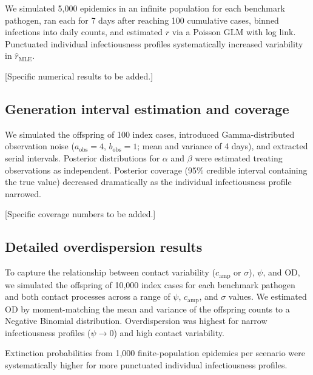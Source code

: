 \documentclass[10pt]{article}
\begin{document}
We simulated 5,000 epidemics in an infinite population for each benchmark pathogen, ran each for 7 days after reaching 100 cumulative cases, binned infections into daily counts, and estimated $r$ via a Poisson GLM with log link. Punctuated individual infectiousness profiles systematically increased variability in $\hat{r}_\text{MLE}$.

[Specific numerical results to be added.]

\subsection{Generation interval estimation and coverage}

We simulated the offspring of 100 index cases, introduced Gamma-distributed observation noise ($a_\text{obs} = 4$, $b_\text{obs} = 1$; mean and variance of 4 days), and extracted serial intervals. Posterior distributions for $\alpha$ and $\beta$ were estimated treating observations as independent. Posterior coverage (95\% credible interval containing the true value) decreased dramatically as the individual infectiousness profile narrowed.

[Specific coverage numbers to be added.]

\subsection{Detailed overdispersion results}

To capture the relationship between contact variability ($c_\text{amp}$ or $\sigma$), $\psi$, and OD, we simulated the offspring of 10,000 index cases for each benchmark pathogen and both contact processes across a range of $\psi$, $c_\text{amp}$, and $\sigma$ values. We estimated OD by moment-matching the mean and variance of the offspring counts to a Negative Binomial distribution. Overdispersion was highest for narrow infectiousness profiles ($\psi \to 0$) and high contact variability.

Extinction probabilities from 1,000 finite-population epidemics per scenario were systematically higher for more punctuated individual infectiousness profiles.

\end{document}
